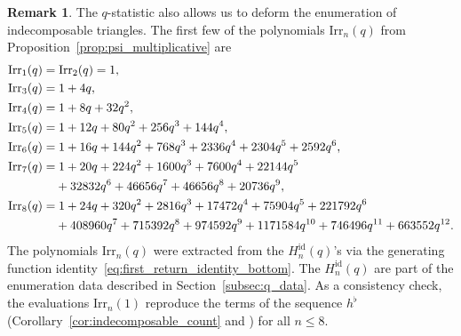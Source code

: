\documentclass[10pt,a4paper]{amsart}
\numberwithin{equation}{section}
\theoremstyle{definition}
\newtheorem{Remark}[Theorem]{Remark}
\begin{document}
\begin{Remark}
	\label{rem:indecomposable_triangles}
	The $q$-statistic also
	allows us to deform the enumeration of indecomposable
	triangles.
	The first few of the polynomials $\mathrm{Irr}_n(q)$ from
	Proposition~\ref{prop:psi_multiplicative} are
	\begin{align*}
			&\mathrm{Irr}_1(q)=\mathrm{Irr}_2(q)=1,\\
			&\mathrm{Irr}_3(q)=1+4q,\\
			&\mathrm{Irr}_4(q)=1+8q+32q^2,\\
			&\mathrm{Irr}_5(q)=1+12q+80q^2+256q^3+144q^4,\\
			&\mathrm{Irr}_6(q)=1+16q+144q^2+768q^3+2336q^4+2304q^5+2592q^6,\\
			&\mathrm{Irr}_7(q)=1+20q+224q^2+1600q^3+7600q^4+22144q^5\\
			&\hphantom{\mathrm{Irr}_7(q)=}{} +32832q^6+46656q^7+46656q^8+20736q^9,\\
			&\mathrm{Irr}_8(q)=1+24q+320q^2+2816q^3+17472q^4+75904q^5+221792q^6\\
			&\hphantom{\mathrm{Irr}_8(q)=}{} +408960q^7+715392q^8+974592q^9+1171584q^{10}+746496q^{11}
			+663552q^{12}.
	\end{align*}
	The polynomials $\mathrm{Irr}_n(q)$ were extracted from the
	$H_n^{\mathrm{id}}(q)$'s via the generating function
	identity~\eqref{eq:first_return_identity_bottom}. The
	$H_n^{\mathrm{id}}(q)$ are part of the enumeration data described in
	Section~\ref{subsec:q_data}.
	As a consistency check, the evaluations $\mathrm{Irr}_n(1)$ reproduce
	the terms of
	the sequence $h^\flat$
	(Corollary~\ref{cor:indecomposable_count} and
	\cite[A362111]{OEIS}) for all $n\le 8$.


\end{Remark}
\end{document}
